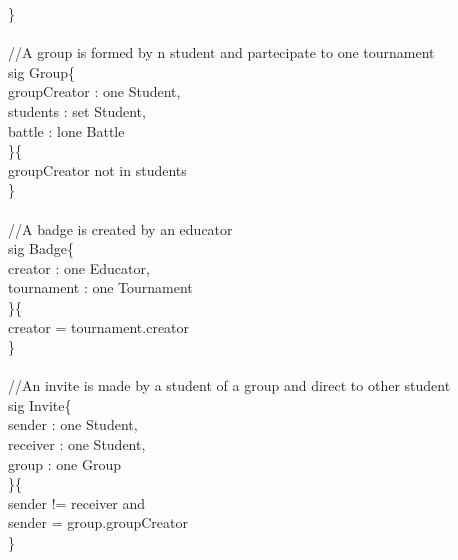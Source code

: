 \documentclass{article}
\begin{document}
{    \}\\
    \\
    \color{gray}
    //A group is formed by n student and partecipate to one tournament\\
    \color{blue}
    sig 
    \color{black}
    Group\{\\
	\-\hspace{1cm}    groupCreator : \color{blue} one \color{black} Student,\\
	\-\hspace{1cm}    students : \color{blue} set \color{black} Student,\\
	\-\hspace{1cm}    battle : \color{blue} lone \color{black} Battle\\
    \}\{\\
	\-\hspace{1cm}    groupCreator \color{blue} not in \color{black} students	\\
    \}\\
    \\
    \color{gray}
    //A badge is created by an educator\\
    \color{blue}
    sig 
    \color{black}
    Badge\{\\
	\-\hspace{1cm}    creator : \color{blue} one \color{black} Educator,\\
	\-\hspace{1cm}    tournament : \color{blue} one \color{black} Tournament\\
    \}\{\\
	\-\hspace{1cm}    creator \color{blue} = \color{black} tournament.creator\\
    \}\\
    \\
    \color{gray}
    //An invite is made by a student of a group and direct to other student\\
    \color{blue}
    sig 
    \color{black}
    Invite\{\\
	\-\hspace{1cm}    sender : \color{blue} one \color{black} Student,\\
	\-\hspace{1cm}    receiver : \color{blue} one \color{black} Student,\\
	\-\hspace{1cm}    group : \color{blue} one \color{black} Group\\
    \}\{\\
	\-\hspace{1cm}    sender \color{blue} != \color{black} receiver \color{blue} and \color{black}\\
	\-\hspace{1cm}    sender \color{blue} = \color{black} group.groupCreator \\
    \}\\
    \\  

}
\end{document}
